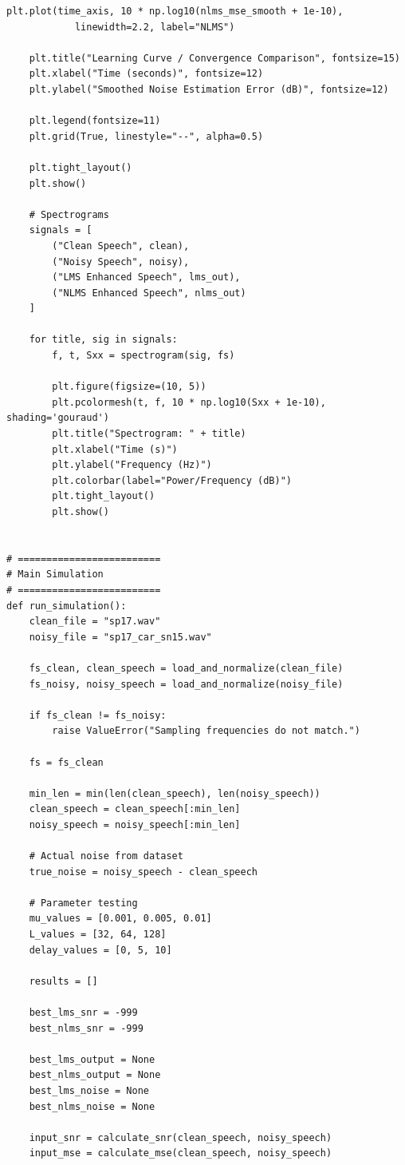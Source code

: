 \documentclass[12pt]{article}
\begin{document}
\begin{lstlisting}[caption={Python implementation of LMS and NLMS adaptive noise cancellation}, label={code:anc_lms_nlms}]
    plt.plot(time_axis, 10 * np.log10(nlms_mse_smooth + 1e-10),
            linewidth=2.2, label="NLMS")

    plt.title("Learning Curve / Convergence Comparison", fontsize=15)
    plt.xlabel("Time (seconds)", fontsize=12)
    plt.ylabel("Smoothed Noise Estimation Error (dB)", fontsize=12)

    plt.legend(fontsize=11)
    plt.grid(True, linestyle="--", alpha=0.5)

    plt.tight_layout()
    plt.show()

    # Spectrograms
    signals = [
        ("Clean Speech", clean),
        ("Noisy Speech", noisy),
        ("LMS Enhanced Speech", lms_out),
        ("NLMS Enhanced Speech", nlms_out)
    ]

    for title, sig in signals:
        f, t, Sxx = spectrogram(sig, fs)

        plt.figure(figsize=(10, 5))
        plt.pcolormesh(t, f, 10 * np.log10(Sxx + 1e-10), shading='gouraud')
        plt.title("Spectrogram: " + title)
        plt.xlabel("Time (s)")
        plt.ylabel("Frequency (Hz)")
        plt.colorbar(label="Power/Frequency (dB)")
        plt.tight_layout()
        plt.show()


# =========================
# Main Simulation
# =========================
def run_simulation():
    clean_file = "sp17.wav"
    noisy_file = "sp17_car_sn15.wav"

    fs_clean, clean_speech = load_and_normalize(clean_file)
    fs_noisy, noisy_speech = load_and_normalize(noisy_file)

    if fs_clean != fs_noisy:
        raise ValueError("Sampling frequencies do not match.")

    fs = fs_clean

    min_len = min(len(clean_speech), len(noisy_speech))
    clean_speech = clean_speech[:min_len]
    noisy_speech = noisy_speech[:min_len]

    # Actual noise from dataset
    true_noise = noisy_speech - clean_speech

    # Parameter testing
    mu_values = [0.001, 0.005, 0.01]
    L_values = [32, 64, 128]
    delay_values = [0, 5, 10]

    results = []

    best_lms_snr = -999
    best_nlms_snr = -999

    best_lms_output = None
    best_nlms_output = None
    best_lms_noise = None
    best_nlms_noise = None

    input_snr = calculate_snr(clean_speech, noisy_speech)
    input_mse = calculate_mse(clean_speech, noisy_speech)


\end{lstlisting}
\end{document}
